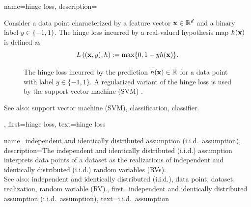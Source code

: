 {
{name={hinge loss}, 
	description={Consider a data point 
		characterized by a feature vector ${\bf x} \in \mathbb{R}^{d}$ and a 
		binary label $y \in \{-1,1\}$. The hinge loss incurred by a real-valued 
		hypothesis map $h({\bf x})$ is defined as 
		\begin{equation} 
			\label{equ_hinge_loss_gls_dict}
				L\left(({\bf x},y),h \right) := \max \{ 0 , 1 - y h({\bf x}) \}. 
		\end{equation}
		\begin{figure}[H]
		\begin{center}
		\caption{The hinge loss incurred by the prediction $h({\bf x}) \in \mathbb{R}$ 
		for a data point with label $y \in \{-1,1\}$. A regularized variant of the hinge 
		loss is used by the support vector machine (SVM) \cite{LampertNowKernel}.}
		\label{fig_hingeloss_dict}
		\end{center}
		\end{figure} 	    
		See also: support vector machine (SVM), classification, classifier.},
	first={hinge loss},
	text={hinge loss}
}

{name={independent and identically distributed assumption (i.i.d.\ assumption)}, 
	description={The independent and identically distributed (i.i.d.) assumption interprets data points of a dataset as the 
		realizations of independent and identically distributed (i.i.d.) random variables (RVs).
				\\
		See also: independent and identically distributed (i.i.d.), data point, dataset, realization, random variable (RV).},
	first={independent and identically distributed assumption (i.i.d.\ assumption)},
	text={i.i.d.\ assumption} 
}

}
